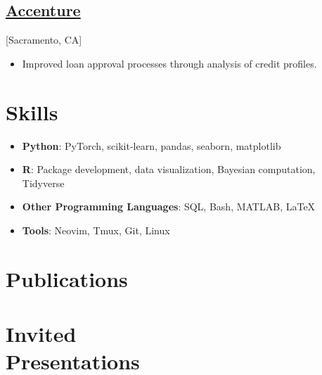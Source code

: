 \documentclass{wm_cv}
\begin{document}
\subsection{\href{https://en.wikipedia.org/wiki/Accenture}{Accenture}}[Sacramento, CA]
\begin{positions}
\end{positions}

\begin{itemize}
  \item Improved loan approval processes through analysis of credit profiles. 
\end{itemize}


\section{Skills}
\begin{itemize}
  \item \textbf{Python}: PyTorch, scikit-learn, pandas, seaborn, matplotlib
  \item \textbf{R}: Package development, data visualization, Bayesian computation, Tidyverse
  \item \textbf{Other Programming Languages}: SQL, Bash, MATLAB, \LaTeX
  \item \textbf{Tools}: Neovim, Tmux, Git, Linux
\end{itemize}



\section{Publications}%


\section{Invited \\ Presentations}
\end{document}
